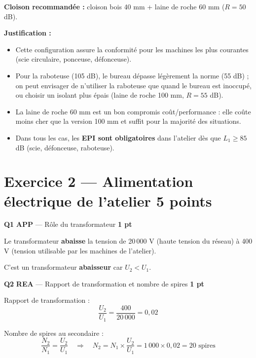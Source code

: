 \documentclass[a4paper,11pt]{article}
\newcommand{\pts}[1]{\hfill\textcolor{gris}{\small\textbf{#1}}}
\newcommand{\comp}[1]{\colorbox{blue!10}{\scriptsize\textbf{#1}}}
\begin{document}
\begin{reponsecorr}
\textbf{Cloison recommandée :} cloison bois 40 mm + laine de roche 60 mm ($R = 50$ dB).

\textbf{Justification :}
\begin{itemize}[nosep]
  \item Cette configuration assure la conformité pour les machines les plus courantes (scie circulaire, ponceuse, défonceuse).
  \item Pour la raboteuse (105 dB), le bureau dépasse légèrement la norme (55 dB) ; on peut envisager de n'utiliser la raboteuse que quand le bureau est inoccupé, ou choisir un isolant plus épais (laine de roche 100 mm, $R = 55$ dB).
  \item La laine de roche 60 mm est un bon compromis coût/performance : elle coûte moins cher que la version 100 mm et suffit pour la majorité des situations.
  \item Dans tous les cas, les \textbf{EPI sont obligatoires} dans l'atelier dès que $L_1 \geq 85$ dB (scie, défonceuse, raboteuse).
\end{itemize}
\end{reponsecorr}

\newpage

\section*{Exercice 2 — Alimentation électrique de l'atelier \pts{5 points}}

\textbf{Q1} \comp{APP} — Rôle du transformateur \pts{1 pt}

\begin{reponsecorr}
Le transformateur \textbf{abaisse} la tension de 20\,000 V (haute tension du réseau) à 400 V (tension utilisable par les machines de l'atelier).

C'est un transformateur \textbf{abaisseur} car $U_2 < U_1$.
\end{reponsecorr}

\textbf{Q2} \comp{REA} — Rapport de transformation et nombre de spires \pts{1 pt}

\begin{reponsecorr}
Rapport de transformation :
$$\frac{U_2}{U_1} = \frac{400}{20\,000} = \boxed{0{,}02}$$

Nombre de spires au secondaire :
$$\frac{N_2}{N_1} = \frac{U_2}{U_1} \quad \Rightarrow \quad N_2 = N_1 \times \frac{U_2}{U_1} = 1\,000 \times 0{,}02 = \boxed{20 \text{ spires}}$$
\end{reponsecorr}
\end{document}
